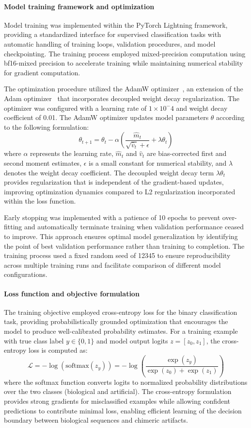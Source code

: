 \documentclass[pdflatex,sn-nature]{sn-jnl}%
\theoremstyle{thmstyleone}%
\theoremstyle{thmstyletwo}%
\theoremstyle{thmstylethree}%
\begin{document}
\paragraph{Model training framework and optimization}
Model training was implemented within the PyTorch Lightning framework, providing a standardized interface for supervised classification tasks with automatic handling of training loops, validation procedures, and model checkpointing.
The training process employed mixed-precision computation using bf16-mixed precision to accelerate training while maintaining numerical stability for gradient computation.

The optimization procedure utilized the AdamW optimizer~\cite{adamw}, an extension of the Adam optimizer~\cite{kingma2014adam} that incorporates decoupled weight decay regularization.
The optimizer was configured with a learning rate of $1\times10^-4$ and weight decay coefficient of 0.01.
The AdamW optimizer updates model parameters $\theta$ according to the following formulation:
$$
	\theta_{t+1} = \theta_t - \alpha \left( \frac{\hat{m}_t}{\sqrt{\hat{v}_t} + \epsilon} + \lambda \theta_t \right)
$$
where $\alpha$ represents the learning rate, $\hat{m}_t$ and $\hat{v}_t$ are bias-corrected first and second moment estimates, $\epsilon$ is a small constant for numerical stability, and $\lambda$ denotes the weight decay coefficient.
The decoupled weight decay term $\lambda \theta_t$ provides regularization that is independent of the gradient-based updates, improving optimization dynamics compared to L2 regularization incorporated within the loss function.

Early stopping was implemented with a patience of 10 epochs to prevent over-fitting and automatically terminate training when validation performance ceased to improve.
This approach ensures optimal model generalization by identifying the point of best validation performance rather than training to completion.
The training process used a fixed random seed of 12345 to ensure reproducibility across multiple training runs and facilitate comparison of different model configurations.

\paragraph{Loss function and objective formulation}
The training objective employed cross-entropy loss for the binary classification task, providing probabilistically grounded optimization that encourages the model to produce well-calibrated probability estimates.
For a training example with true class label $y \in \{0,1\}$ and model output logits $z = [z_0, z_1]$, the cross-entropy loss is computed as:
$$
	\mathcal{L} = -\log(\textrm{softmax}(z_y)) = -\log\left(\frac{\exp(z_y)}{\exp(z_0) + \exp(z_1)}\right)
$$
where the softmax function converts logits to normalized probability distributions over the two classes (biological and artificial).
The cross-entropy formulation provides strong gradients for misclassified examples while allowing confident predictions to contribute minimal loss, enabling efficient learning of the decision boundary between biological sequences and chimeric artifacts.
\end{document}
